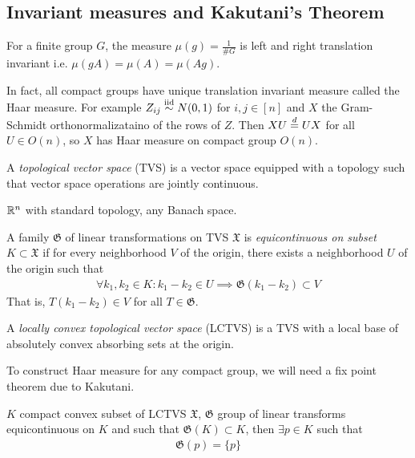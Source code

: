 \subsection{Invariant measures and Kakutani's Theorem}

For a finite group $G$, the measure $\mu(g) = \frac{1}{\# G}$ is
left and right translation invariant i.e. $\mu(gA) = \mu(A) = \mu(Ag)$.

In fact, all compact groups have unique translation invariant measure
called the Haar measure. For example $Z_{ij} \overset{\text{iid}}{\sim} N(0,1)$ for $i,j \in [n]$
and $X$ the Gram-Schmidt orthonormalizataino of the rows of $Z$.
Then $X U \overset{d}{=} U X$ for all $U \in O(n)$, so $X$ has Haar measure
on compact group $O(n)$.

\begin{definition}
  A \emph{topological vector space} (TVS) is a vector space equipped with
  a topology such that vector space operations are jointly
  continuous.
\end{definition}

\begin{example}
  $\mathbb{R}^n$ with standard topology, any Banach space.
\end{example}

\begin{definition}
  \label{def:equicontinuous}
  A family $\mathfrak{G}$ of linear transformations on TVS
  $\mathfrak{X}$ is \emph{equicontinuous on subset $K \subset \mathfrak{X}$}
  if for every neighborhood $V$ of the origin, there exists a neighborhood
  $U$ of the origin such that
  \begin{align}
    \forall k_1, k_2 \in K: k_1 - k_2 \in U \implies \mathfrak{G}(k_1 - k_2) \subset V
  \end{align}
  That is, $T(k_1 - k_2) \in V$ for all $T \in \mathfrak{G}$.
\end{definition}

\begin{definition}
  A \emph{locally convex topological vector space} (LCTVS) is a TVS
  with a local base of absolutely convex absorbing sets at the origin.
\end{definition}

To construct Haar measure for any compact group, we will need a fix point
theorem due to Kakutani.

\begin{theorem}
  \label{thm:kakutani}
  $K$ compact convex subset of LCTVS $\mathfrak{X}$,
  $\mathfrak{G}$ group of linear transforms equicontinuous on $K$
  and such that $\mathfrak{G}(K) \subset K$,
  then $\exists p \in K$ such that
  \begin{align}
    \mathfrak{G}(p) = \{p\}
  \end{align}
\end{theorem}

